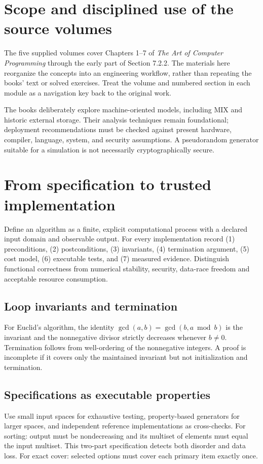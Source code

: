 \documentclass[11pt,letterpaper]{article}
\begin{document}
\tableofcontents
\clearpage
{}
\section{Scope and disciplined use of the source volumes}
The five supplied volumes cover Chapters 1--7 of \emph{The Art of Computer Programming} through the early part of Section 7.2.2. The materials here reorganize the concepts into an engineering workflow, rather than repeating the books' text or solved exercises. Treat the volume and numbered section in each module as a navigation key back to the original work.
\begin{engineeringnote}[title=Classical theory versus current practice]
The books deliberately explore machine-oriented models, including MIX and historic external storage. Their analysis techniques remain foundational; deployment recommendations must be checked against present hardware, compiler, language, system, and security assumptions. A pseudorandom generator suitable for a simulation is not necessarily cryptographically secure.
\end{engineeringnote}
\section{From specification to trusted implementation}
Define an algorithm as a finite, explicit computational process with a declared input domain and observable output. For every implementation record (1) preconditions, (2) postconditions, (3) invariants, (4) termination argument, (5) cost model, (6) executable tests, and (7) measured evidence. Distinguish functional correctness from numerical stability, security, data-race freedom and acceptable resource consumption.
\subsection{Loop invariants and termination}
For Euclid's algorithm, the identity $\gcd(a,b)=\gcd(b,a\bmod b)$ is the invariant and the nonnegative divisor strictly decreases whenever $b\ne 0$. Termination follows from well-ordering of the nonnegative integers. A proof is incomplete if it covers only the maintained invariant but not initialization and termination.
\subsection{Specifications as executable properties}
Use small input spaces for exhaustive testing, property-based generators for larger spaces, and independent reference implementations as cross-checks. For sorting: output must be nondecreasing and its multiset of elements must equal the input multiset. This two-part specification detects both disorder and data loss. For exact cover: selected options must cover each primary item exactly once.
\end{document}
